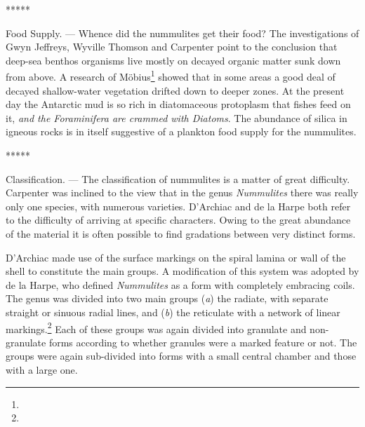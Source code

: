 \documentclass[a4paper, 12pt, oneside]{article}
\begin{document}
\centerline{*\hspace{15mm}*\hspace{15mm}*\hspace{15mm}*\hspace{15mm}*}
\bigskip

Food Supply. --- Whence did the nummulites get their food? The investigations of Gwyn Jeffreys, Wyville Thomson and Carpenter point to the conclusion that deep-sea benthos organisms live mostly on decayed organic matter sunk down from above. A research of Möbius\footnote{} showed that in some areas a good deal of decayed shallow-water vegetation drifted down to deeper zones. At the present day the Antarctic mud is so rich in diatomaceous protoplasm that fishes feed on it, \emph{and the Foraminifera are crammed with Diatoms}. The abundance of silica in igneous rocks is in itself suggestive of a plankton food supply for the nummulites.

\centerline{*\hspace{15mm}*\hspace{15mm}*\hspace{15mm}*\hspace{15mm}*}
\bigskip

Classification. --- The classification of nummulites is a matter of great difficulty. Carpenter was inclined to the view that in the genus \emph{Nummulites} there was really only one species, with numerous varieties. D'Archiac and de la Harpe both refer to the difficulty of arriving at specific characters. Owing to the great abundance of the material it is often possible to find gradations between very distinct forms.

D'Archiac made use of the surface markings on the spiral lamina or wall of the shell to constitute the main groups. A modification of this system was adopted by de la Harpe, who defined \emph{Nummulites} as a form with completely embracing coils. The genus was divided into two main groups (\emph{a}) the radiate, with separate straight or sinuous radial lines, and (\emph{b}) the reticulate with a network of linear markings.\footnote{} Each of these groups was again divided into granulate and non-granulate forms according to whether granules were a marked feature or not. The groups were again sub-divided into forms with a small central chamber and those with a large one.
\end{document}

